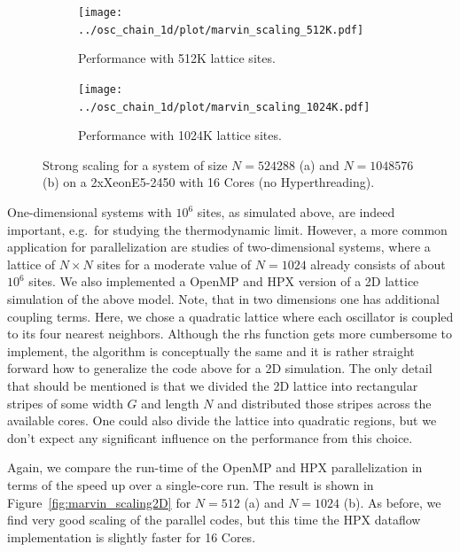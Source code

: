 \documentclass[a4wide,10pt]{scrartcl}
\begin{document}
\begin{figure}
 \begin{subfigure}[b]{0.49\textwidth}
  \centering
  \texttt{[image: ../osc\_chain\_1d/plot/marvin\_scaling\_512K.pdf]}\hfill
  \caption{Performance with 512K lattice sites.} 
  \label{fig:scaling_marvin_512K}
 \end{subfigure}
 \begin{subfigure}[b]{0.49\textwidth}
  \centering
  \texttt{[image: ../osc\_chain\_1d/plot/marvin\_scaling\_1024K.pdf]}\hfill
  \caption{Performance with 1024K lattice sites.} 
  \label{fig:scaling_marvin_1024K}
 \end{subfigure}
 \caption{Strong scaling for a system of size $N=524288$ (a) and $N=1048576$ (b) on a 2xXeonE5-2450 with 16 Cores (no Hyperthreading). 
 }
 \label{fig:marvin_scaling}
\end{figure}

One-dimensional systems with $10^6$ sites, as simulated above, are indeed important, e.g.\ for studying the thermodynamic limit.
However, a more common application for parallelization are studies of two-dimensional systems, where a lattice of $N\times N$ sites for a moderate value of $N=1024$ already consists of about $10^6$ sites.
We also implemented a OpenMP and HPX version of a 2D lattice simulation of the above model.
Note, that in two dimensions one has additional coupling terms.
Here, we chose a quadratic lattice where each oscillator is coupled to its four nearest neighbors.
Although the rhs function gets more cumbersome to implement, the algorithm is conceptually the same and it is rather straight forward how to generalize the code above for a 2D simulation.
The only detail that should be mentioned is that we divided the 2D lattice into rectangular stripes of some width $G$ and length $N$ and distributed those stripes across the available cores.
One could also divide the lattice into quadratic regions, but we don't expect any significant influence on the performance from this choice.

Again, we compare the run-time of the OpenMP and HPX parallelization in terms of the speed up over a single-core run.
The result is shown in Figure~\ref{fig:marvin_scaling2D} for $N=512$ (a) and $N=1024$ (b).
As before, we find very good scaling of the parallel codes, but this time the HPX dataflow implementation is slightly faster for 16 Cores.
\end{document}
